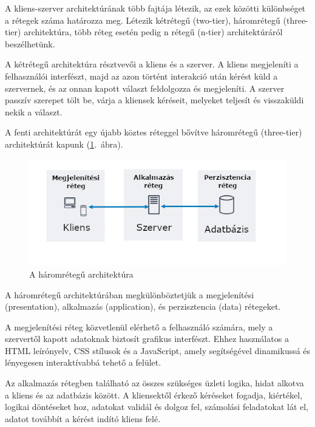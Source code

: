\documentclass[
]{thesis-ekf}
\theoremstyle{definition}
\theoremstyle{remark}
\begin{document}
	A kliens-szerver architektúrának több fajtája létezik, az ezek közötti különbséget a rétegek száma határozza meg. Létezik kétrétegű (two-tier), háromrétegű (three-tier) architektúra, több réteg esetén pedig n rétegű (n-tier) architektúráról beszélhetünk.
	
	A kétrétegű architektúra résztvevői a kliens és a szerver. A kliens megjeleníti a felhasználói interfészt, majd az azon történt interakció után kérést küld a szervernek, és az onnan kapott választ feldolgozza és megjeleníti.
	A szerver passzív szerepet tölt be, várja a kliensek kéréseit, melyeket teljesít és visszaküldi nekik a választ.
	
	A fenti architektúrát egy újabb köztes réteggel bővítve háromrétegű (three-tier) architektúrát kapunk (\ref{fig:haromretegu}.~ábra).
	
	\begin{figure}[!h]
		\centering
		\includegraphics[width=12cm]{kepek/three-tier.png}
		\caption[A háromrétegű architektúra]{A háromrétegű architektúra\footnotemark}
		\label{fig:haromretegu}
	\end{figure}
	
	A háromrétegű architektúrában megkülönböztetjük a megjelenítési (presentation), alkalmazás (application), és perzisztencia (data) rétegeket.\cite{tierarchitecture}
	
	A megjelenítési réteg közvetlenül elérhető a felhasználó számára, mely a szervertől kapott adatoknak biztosít grafikus interfészt. Ehhez használatos a HTML leírónyelv, CSS stílusok és a JavaScript, amely segítségével dinamikussá és lényegesen interaktívabbá tehető a felület.
	
	Az alkalmazás rétegben található az összes szükséges üzleti logika, hidat alkotva a kliens és az adatbázis között. A kliensektől érkező kéréseket fogadja, kiértékel, logikai döntéseket hoz, adatokat validál és dolgoz fel, számolási feladatokat lát el, adatot továbbít a kérést indító kliens felé.
	
\end{document}

